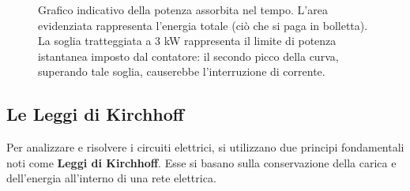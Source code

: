 \documentclass[12pt, a4paper]{article}
\begin{document}
\begin{itemize}[label=\textcolor{titlecolor}{\Large\textbullet}, itemsep=12pt, parsep=4pt, leftmargin=1.5cm]
\begin{figure}[H]
			\caption{Grafico indicativo della potenza assorbita nel tempo. L'area evidenziata rappresenta l'energia totale (ciò che si paga in bolletta). La soglia tratteggiata a 3 kW rappresenta il limite di potenza istantanea imposto dal contatore: il secondo picco della curva, superando tale soglia, causerebbe l'interruzione di corrente.}
		\end{figure}
		
	\end{itemize}
	
	\subsection*{Le Leggi di Kirchhoff}
	
	Per analizzare e risolvere i circuiti elettrici, si utilizzano due principi fondamentali noti come \textbf{Leggi di Kirchhoff}. Esse si basano sulla conservazione della carica e dell'energia all'interno di una rete elettrica.
	
\end{document}
